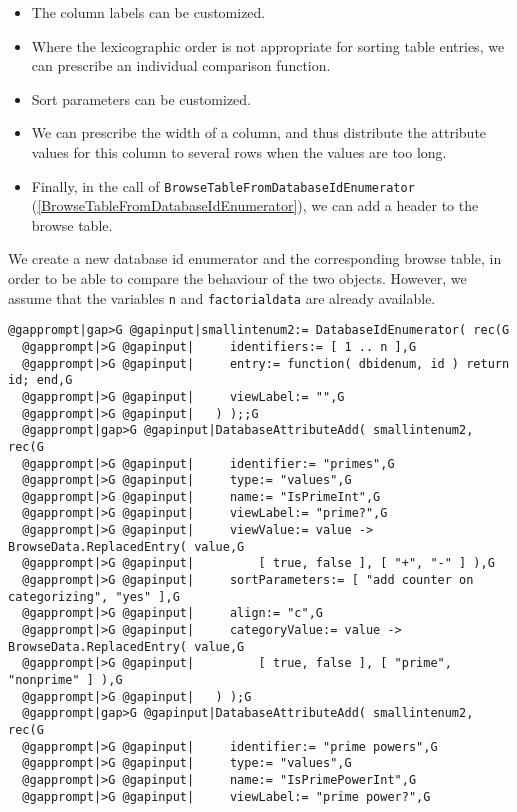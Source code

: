 \documentclass[a4paper,11pt]{report}
\begin{document}
{{\begin{itemize}
column do usually not provide suitable category rows; we can prescribe
individual category values. 
\item  The column labels can be customized. 
\item  Where the lexicographic order is not appropriate for sorting table entries, we
can prescribe an individual comparison function. 
\item  Sort parameters can be customized. 
\item  We can prescribe the width of a column, and thus distribute the attribute
values for this column to several rows when the values are too long. 
\item  Finally, in the call of \texttt{BrowseTableFromDatabaseIdEnumerator} (\ref{BrowseTableFromDatabaseIdEnumerator}), we can add a header to the browse table. 
\end{itemize}
 We create a new database id enumerator and the corresponding browse table, in
order to be able to compare the behaviour of the two objects. However, we
assume that the variables \texttt{n} and \texttt{factorialdata} are already available. 
\begin{Verbatim}[commandchars=@|G,fontsize=\small,frame=single,label=Example]
  @gapprompt|gap>G @gapinput|smallintenum2:= DatabaseIdEnumerator( rec(G
  @gapprompt|>G @gapinput|     identifiers:= [ 1 .. n ],G
  @gapprompt|>G @gapinput|     entry:= function( dbidenum, id ) return id; end,G
  @gapprompt|>G @gapinput|     viewLabel:= "",G
  @gapprompt|>G @gapinput|   ) );;G
  @gapprompt|gap>G @gapinput|DatabaseAttributeAdd( smallintenum2, rec(G
  @gapprompt|>G @gapinput|     identifier:= "primes",G
  @gapprompt|>G @gapinput|     type:= "values",G
  @gapprompt|>G @gapinput|     name:= "IsPrimeInt",G
  @gapprompt|>G @gapinput|     viewLabel:= "prime?",G
  @gapprompt|>G @gapinput|     viewValue:= value -> BrowseData.ReplacedEntry( value,G
  @gapprompt|>G @gapinput|         [ true, false ], [ "+", "-" ] ),G
  @gapprompt|>G @gapinput|     sortParameters:= [ "add counter on categorizing", "yes" ],G
  @gapprompt|>G @gapinput|     align:= "c",G
  @gapprompt|>G @gapinput|     categoryValue:= value -> BrowseData.ReplacedEntry( value,G
  @gapprompt|>G @gapinput|         [ true, false ], [ "prime", "nonprime" ] ),G
  @gapprompt|>G @gapinput|   ) );G
  @gapprompt|gap>G @gapinput|DatabaseAttributeAdd( smallintenum2, rec(G
  @gapprompt|>G @gapinput|     identifier:= "prime powers",G
  @gapprompt|>G @gapinput|     type:= "values",G
  @gapprompt|>G @gapinput|     name:= "IsPrimePowerInt",G
  @gapprompt|>G @gapinput|     viewLabel:= "prime power?",G

\end{Verbatim}}}
\end{document}
